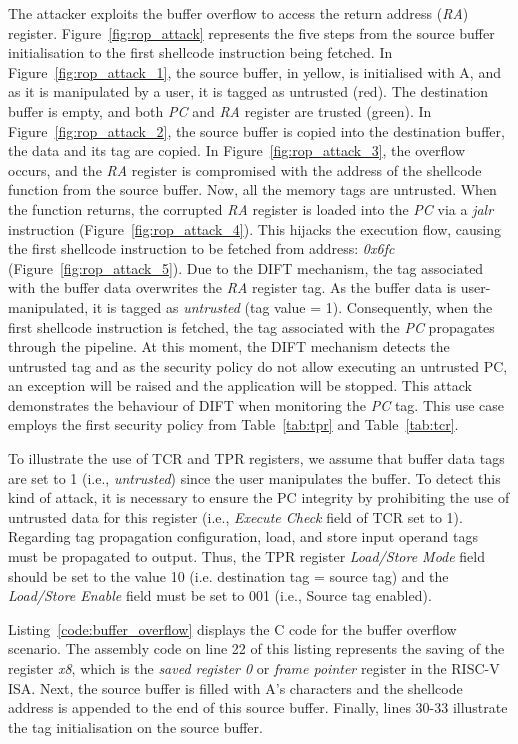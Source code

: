 The attacker exploits the buffer overflow to access the return address (\textit{RA}) register.
Figure~\ref{fig:rop_attack} represents the five steps from the source buffer initialisation to the first shellcode instruction being fetched. In Figure~\ref{fig:rop_attack_1}, the source buffer, in yellow, is initialised with A, and as it is manipulated by a user, it is tagged as untrusted (red). The destination buffer is empty, and both \textit{PC} and \textit{RA} register are trusted (green). In Figure~\ref{fig:rop_attack_2}, the source buffer is copied into the destination buffer, the data and its tag are copied. In Figure~\ref{fig:rop_attack_3}, the overflow occurs, and the \textit{RA} register is compromised with the address of the shellcode function from the source buffer. Now, all the memory tags are untrusted.
When the function returns, the corrupted \textit{RA} register is loaded into the \textit{PC} via a \textit{jalr} instruction (Figure~\ref{fig:rop_attack_4}). This hijacks the execution flow, causing the first shellcode instruction to be fetched from address: \textit{0x6fc} (Figure~\ref{fig:rop_attack_5}).  Due to the DIFT mechanism, the tag associated with the buffer data overwrites the \textit{RA} register tag.
As the buffer data is user-manipulated, it is tagged as \textit{untrusted} (tag value = 1).
Consequently, when the first shellcode instruction is fetched, the tag associated with the \textit{PC} propagates through the pipeline. At this moment, the DIFT mechanism detects the untrusted tag and as the security policy do not allow executing an untrusted PC, an exception will be raised and the application will be stopped.
This attack demonstrates the behaviour of DIFT when monitoring the \textit{PC} tag.
This use case employs the first security policy from Table~\ref{tab:tpr} and Table~\ref{tab:tcr}.

To illustrate the use of TCR and TPR registers, we assume that buffer data tags are set to 1 (i.e., \textit{untrusted}) since the user manipulates the buffer.
To detect this kind of attack, it is necessary to ensure the PC integrity by prohibiting the use of untrusted data for this register (i.e., \textit{Execute Check} field of TCR set to 1). Regarding tag propagation configuration, load, and store input operand tags must be propagated to output. Thus, the TPR register \textit{Load/Store Mode} field should be set to the value 10 (i.e. destination tag = source tag) and the \textit{Load/Store Enable} field must be set to 001 (i.e., Source tag enabled).

Listing~\ref{code:buffer_overflow} displays the C code for the buffer overflow scenario. The assembly code on line 22 of this listing represents the saving of the register \textit{x8}, which is the \textit{saved register 0} or \textit{frame pointer} register in the RISC-V ISA. Next, the source buffer is filled with A's characters and the shellcode address is appended to the end of this source buffer. Finally, lines 30-33 illustrate the tag initialisation on the source buffer.

